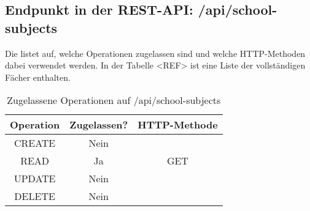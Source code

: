 \subsection{Endpunkt in der REST-API: /api/school-subjects}
\label{sec:end:rest:api:school-subjects}
Die  listet auf, welche Operationen zugelassen sind und welche HTTP-Methoden dabei verwendet werden. 
In der Tabelle <REF> ist eine Liste der vollständigen Fächer enthalten.

\begin{table}[!htbp]
	\begin{tabular}{|c|c|c|}
		\hline
			\textbf{Operation} & \textbf{Zugelassen?} & \textbf{HTTP-Methode} \\ \hline
			CREATE & Nein & \\ \hline 
			READ & Ja & GET \\ \hline
			UPDATE & Nein & \\ \hline 
			DELETE & Nein & \\ \hline
	\end{tabular}

		\caption{Zugelassene Operationen auf /api/school-subjects}
		\label{tab:end:rest:api:school-subjects:meth}
\end{table}




